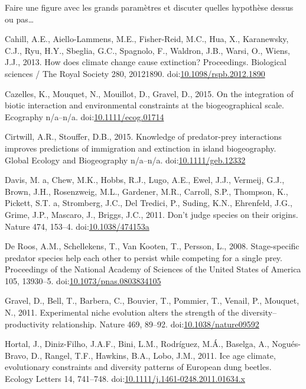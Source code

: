 Faire une figure avec les grands paramètres et discuter quelles
hypothèse dessus ou pas\ldots{}

\hypertarget{refs}{}
\hypertarget{ref-Cahill2013}{}
Cahill, A.E., Aiello-Lammens, M.E., Fisher-Reid, M.C., Hua, X.,
Karanewsky, C.J., Ryu, H.Y., Sbeglia, G.C., Spagnolo, F., Waldron, J.B.,
Warsi, O., Wiens, J.J., 2013. How does climate change cause extinction?
Proceedings. Biological sciences / The Royal Society 280, 20121890.
doi:\href{https://doi.org/10.1098/rspb.2012.1890}{10.1098/rspb.2012.1890}

\hypertarget{ref-Cazelles2015b}{}
Cazelles, K., Mouquet, N., Mouillot, D., Gravel, D., 2015. On the
integration of biotic interaction and environmental constraints at the
biogeographical scale. Ecography n/a--n/a.
doi:\href{https://doi.org/10.1111/ecog.01714}{10.1111/ecog.01714}

\hypertarget{ref-Cirtwill2015}{}
Cirtwill, A.R., Stouffer, D.B., 2015. Knowledge of predator-prey
interactions improves predictions of immigration and extinction in
island biogeography. Global Ecology and Biogeography n/a--n/a.
doi:\href{https://doi.org/10.1111/geb.12332}{10.1111/geb.12332}

\hypertarget{ref-Davis2011}{}
Davis, M. a, Chew, M.K., Hobbs, R.J., Lugo, A.E., Ewel, J.J., Vermeij,
G.J., Brown, J.H., Rosenzweig, M.L., Gardener, M.R., Carroll, S.P.,
Thompson, K., Pickett, S.T. a, Stromberg, J.C., Del Tredici, P., Suding,
K.N., Ehrenfeld, J.G., Grime, J.P., Mascaro, J., Briggs, J.C., 2011.
Don't judge species on their origins. Nature 474, 153--4.
doi:\href{https://doi.org/10.1038/474153a}{10.1038/474153a}

\hypertarget{ref-DeRoos2008}{}
De Roos, A.M., Schellekens, T., Van Kooten, T., Persson, L., 2008.
Stage-specific predator species help each other to persist while
competing for a single prey. Proceedings of the National Academy of
Sciences of the United States of America 105, 13930--5.
doi:\href{https://doi.org/10.1073/pnas.0803834105}{10.1073/pnas.0803834105}

\hypertarget{ref-Gravel2011c}{}
Gravel, D., Bell, T., Barbera, C., Bouvier, T., Pommier, T., Venail, P.,
Mouquet, N., 2011. Experimental niche evolution alters the strength of
the diversity--productivity relationship. Nature 469, 89--92.
doi:\href{https://doi.org/10.1038/nature09592}{10.1038/nature09592}

\hypertarget{ref-Hortal2011}{}
Hortal, J., Diniz-Filho, J.A.F., Bini, L.M., Rodríguez, M.Á., Baselga,
A., Nogués-Bravo, D., Rangel, T.F., Hawkins, B.A., Lobo, J.M., 2011. Ice
age climate, evolutionary constraints and diversity patterns of European
dung beetles. Ecology Letters 14, 741--748.
doi:\href{https://doi.org/10.1111/j.1461-0248.2011.01634.x}{10.1111/j.1461-0248.2011.01634.x}

